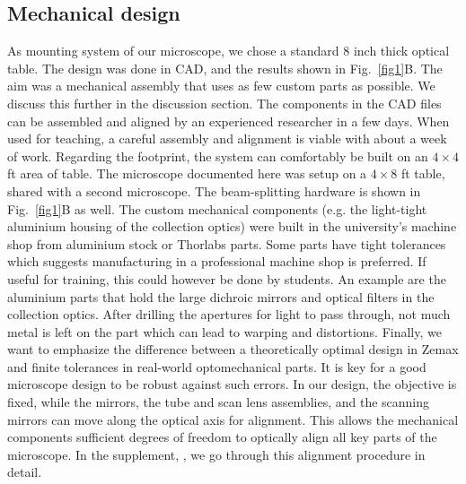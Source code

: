 \documentclass[10pt,letterpaper]{article}
\begin{document}
\subsection*{Mechanical design}
As mounting system of our microscope, we chose a standard 8 inch thick optical table. The design was done in CAD, and the results shown in Fig.~\ref{fig1}B. The aim was a mechanical assembly that uses as few custom parts as possible. We discuss this further in the discussion section. The components in the CAD files can be assembled and aligned by an experienced researcher in a few days. When used for teaching, a careful assembly and alignment is viable with about a week of work. Regarding the footprint, the system can comfortably be built on an $4\times4$ ft area of table. The microscope documented here was setup on a $4\times8$ ft table, shared with a second microscope. The beam-splitting hardware is shown in Fig.~\ref{fig1}B as well.\newline
The custom mechanical components (e.g. the light-tight aluminium housing of the collection optics) were built in the university's machine shop from aluminium stock or Thorlabs parts. Some parts have tight tolerances which suggests manufacturing in a professional machine shop is preferred. If useful for training, this could however be done by students. An example are the aluminium parts that hold the large dichroic mirrors and optical filters in the collection optics. After drilling the apertures for light to pass through, not much metal is left on the part which can lead to warping and distortions.\newline
Finally, we want to emphasize the difference between a theoretically optimal design in Zemax and finite tolerances in real-world optomechanical parts. It is key for a good microscope design to be robust against such errors. In our design, the objective is fixed, while the mirrors, the tube and scan lens assemblies, and the scanning mirrors can move along the optical axis for alignment. This allows the mechanical components sufficient degrees of freedom to optically align all key parts of the microscope. In the supplement, , we go through this alignment procedure in detail.
\end{document}
